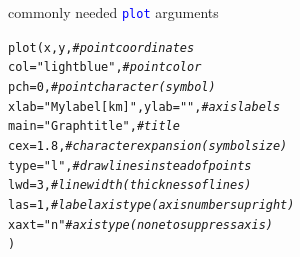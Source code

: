 \documentclass[xcolor=table,       handout,    xcolor=dvipsnames]{beamer}\usepackage[]{graphicx}\usepackage[]{color}
\makeatletter
\newcommand{\hlnum}[1]{\textcolor[rgb]{0,0,0}{#1}}
\newcommand{\hlstr}[1]{\textcolor[rgb]{0.545,0.137,0.137}{#1}}
\newcommand{\hlcom}[1]{\textcolor[rgb]{0,0.392,0}{\textit{#1}}}
\newcommand{\hlopt}[1]{\textcolor[rgb]{0,0,0}{#1}}
\newcommand{\hlstd}[1]{\textcolor[rgb]{0,0,0}{#1}}
\newcommand{\hlkwc}[1]{\textcolor[rgb]{1,0,1}{#1}}
\newcommand{\hlkwd}[1]{\textcolor[rgb]{0,0,1}{#1}}
\newenvironment{kframe}{%
 \def\at@end@of@kframe{}%
 \ifinner\ifhmode%
  \def\at@end@of@kframe{\end{minipage}}%
  \begin{minipage}{\columnwidth}%
 \fi\fi%
 \def\FrameCommand##1{\hskip\@totalleftmargin \hskip-\fboxsep
 \colorbox{shadecolor}{##1}\hskip-\fboxsep
     \hskip-\linewidth \hskip-\@totalleftmargin \hskip\columnwidth}%
 \MakeFramed {\advance\hsize-\width
   \@totalleftmargin\z@ \linewidth\hsize
   \@setminipage}}%
 {\par\unskip\endMakeFramed%
 \at@end@of@kframe}
\newenvironment{knitrout}{}{} %
\newcounter{exercisecount}
\newcommand{\rcode}[1]{\texttt{\textcolor{Blue}{#1}}} %
\makeatother
\begin{document}



\begin{frame}[fragile]{commonly needed \rcode{plot} arguments}
\begin{knitrout}
\color{fgcolor}\begin{kframe}
\begin{alltt}
\hlkwd{plot}\hlstd{(x, y,} \hlcom{# point coordinates}
\hlkwc{col}\hlstd{=}\hlstr{"lightblue"}\hlstd{,} \hlcom{# point color}
\hlkwc{pch}\hlstd{=}\hlnum{0}\hlstd{,} \hlcom{# point character (symbol)}
\hlkwc{xlab}\hlstd{=}\hlstr{"My label  [km]"}\hlstd{,} \hlkwc{ylab}\hlstd{=}\hlstr{""}\hlstd{,} \hlcom{# axis labels}
\hlkwc{main}\hlstd{=}\hlstr{"Graph title"}\hlstd{,} \hlcom{# title}
\hlkwc{cex}\hlstd{=}\hlnum{1.8}\hlstd{,} \hlcom{# character expansion (symbol size)}
\hlkwc{type}\hlstd{=}\hlstr{"l"}\hlstd{,} \hlcom{# draw lines instead of points}
\hlkwc{lwd}\hlstd{=}\hlnum{3}\hlstd{,} \hlcom{# line width (thickness of lines)}
\hlkwc{las}\hlstd{=}\hlnum{1}\hlstd{,} \hlcom{# label axis type (axis numbers upright)}
\hlkwc{xaxt}\hlstd{=}\hlstr{"n"} \hlcom{# axis type (none to suppress axis)}
\hlstd{)}
\end{alltt}
\end{kframe}
\end{knitrout}
\end{frame}
\end{document}
